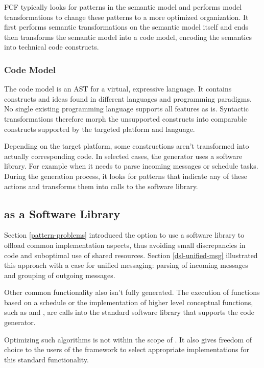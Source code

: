 \documentclass[conference]{IEEEtran}
\begin{document}
FCF typically looks for patterns in the semantic model and performs model
transformations to change these patterns to a more optimized organization. It
first performs semantic transformations on the semantic model itself and ends
then transforms the semantic model into a code model, encoding the semantics
into technical code constructs.

\subsubsection{Code Model}

The code model is an AST for a virtual, expressive language. It contains
constructs and ideas found in different languages and programming paradigms. No
single existing programming language supports all features as is. Syntactic
transformations therefore morph the unsupported constructs into comparable
constructs supported by the targeted platform and language.

Depending on the target platform, some constructions aren't transformed into
actually corresponding code. In selected cases, the generator uses a software
library. For example when it needs to parse incoming messages or schedule
tasks. During the generation process, it looks for patterns that indicate any
of these actions and transforms them into calls to the \NAME software library.

\subsection{\NAME as a Software Library}
\label{software-lib-design}

Section \ref{pattern-problems} introduced the option to use a software library
to offload common implementation aspects, thus avoiding small discrepancies in
code and suboptimal use of shared resources. Section \ref{dsl-unified-msg}
illustrated this approach with a case for unified messaging: parsing of
incoming messages and grouping of outgoing messages.

Other common functionality also isn't fully generated. The execution of
functions based on a schedule or the implementation of higher level conceptual
functions, such as  and , are calls into the standard
software library that supports the code generator.

Optimizing such algorithms is not within the scope of \NAME. It also gives
freedom of choice to the users of the framework to select appropriate
implementations for this standard functionality.
\end{document}
